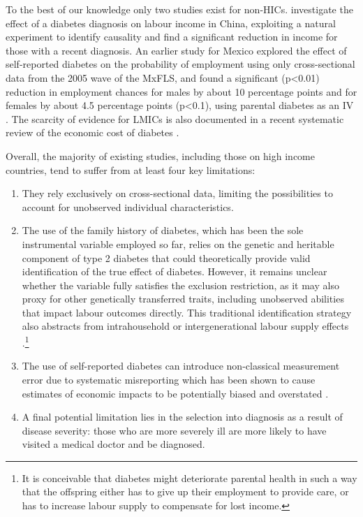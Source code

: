 To the best of our knowledge only two studies exist for non-\acp{HIC}. \textcite{Liu2014} investigate the effect of a diabetes diagnosis on labour income in China, exploiting a natural experiment to identify causality and find a significant reduction in income for those with a recent diagnosis. An earlier study for Mexico explored the effect of self-reported diabetes on the probability of employment using only cross-sectional data from the 2005 wave of the \ac{MxFLS}, and found a significant (p<0.01) reduction in employment chances for males by about 10 percentage points and for females by about 4.5  percentage points (p<0.1), using parental diabetes as an \ac{IV} \parencite{Seuring2015}. The scarcity of evidence for \acp{LMIC} is also documented in a recent systematic review of the economic cost of diabetes \parencite{Seuring2015a}. 


Overall, the majority of existing studies, including those on high income countries, tend to suffer from at least four key limitations: 
\begin{enumerate}
\item  They rely exclusively on cross-sectional data, limiting the possibilities to account for unobserved individual characteristics.
\item The use of the family history of diabetes, which has been the sole instrumental variable employed so far, relies on the genetic and heritable component of type 2 diabetes that could theoretically provide valid identification of the true effect of diabetes. However, it remains unclear whether the variable fully satisfies the exclusion restriction, as it may also proxy for other genetically transferred traits, including unobserved abilities that impact labour outcomes directly. This traditional identification strategy also abstracts from intrahousehold or intergenerational labour supply effects \parencite{Seuring2015}.\footnote{It is conceivable that diabetes might deteriorate parental health in such a way that the offspring either has to give up their employment to provide care, or has to increase labour supply to compensate for lost income.}
\item The use of self-reported diabetes can introduce non-classical measurement error due to systematic misreporting which has been shown to cause estimates of economic impacts to be potentially biased and overstated \parencite{Cawley2015,ONeill2013,Perks2015}.
\item A final potential limitation lies in the selection into diagnosis as a result of disease severity: those who are more severely ill are more likely to have visited a medical doctor and be diagnosed.  
\end{enumerate}

